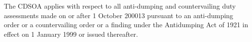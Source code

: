 \begin{tcolorbox}[breakable]
 \quad The CDSOA applies with respect to all anti-dumping and countervailing duty assessments
made on or after 1 October 200013 pursuant to an anti-dumping order or a countervailing order or a
finding under the Antidumping Act of 1921 in effect on 1 January 1999 or issued thereafter.

\end{tcolorbox}